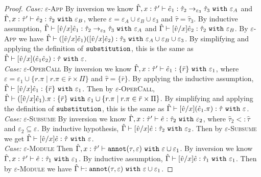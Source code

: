\begin{appendix}
\begin{proof}
\textit{Case:} \textsc{$\varepsilon$-App} By inversion we know $\hat \Gamma, x: \hat \tau' \vdash \hat e_1:\hat \tau_2 \rightarrow_{\varepsilon_3} \hat \tau_3~\mathtt{with}~ \varepsilon_A$ and $\hat \Gamma, x: \hat \tau' \vdash \hat e_2: \hat \tau_2~\mathtt{with}~ \varepsilon_B$, where $\varepsilon = \varepsilon_A \cup \varepsilon_B \cup \varepsilon_3$ and $\hat \tau = \hat \tau_3$. By inductive assumption, $\hat \Gamma \vdash [\hat v/x]\hat e_1: \hat \tau_2 \rightarrow_{\varepsilon_3} \hat \tau_3~\mathtt{with}~ \varepsilon_A$ and $\hat \Gamma \vdash [\hat v/x]\hat e_2: \hat \tau_2~\mathtt{with}~ \varepsilon_B$. By \textsc{$\varepsilon$-App} we have $\hat \Gamma \vdash ([\hat v/x]\hat e_1) ([\hat v/x]\hat e_2) : \hat \tau_3~\mathtt{with}~ \varepsilon_A \cup \varepsilon_B \cup \varepsilon_3$. By simplifying and applying the definition of $\mathtt{substitution}$, this is the same as $\hat \Gamma \vdash [\hat v/x](\hat e_1 \hat e_2): \hat \tau~\mathtt{with}~ \varepsilon$. \\

\textit{Case:} \textsc{$\varepsilon$-OperCall} By inversion we know $\hat \Gamma, x: \hat \tau' \vdash \hat e_1: \{ \bar r \}~\mathtt{with}~ \varepsilon_1$, where $\varepsilon = \varepsilon_1 \cup \{ r.\pi \mid r.\pi \in \bar r \times \Pi \}$ and $\hat \tau = \{ \bar r \}$. By applying the inductive assumption, $\hat \Gamma \vdash [\hat v/x]\hat e_1 : \{ \bar r \} ~\mathtt{with}~ \varepsilon_1$. Then by \textsc{$\varepsilon$-OperCall}, $\hat \Gamma \vdash ([\hat v/x]\hat e_1).\pi: \{ \bar r \}~\mathtt{with}~ \varepsilon_1 \cup \{ r.\pi \mid r.\pi \in \bar r \times \Pi \}$. By simplifying and applying the definition of $\mathtt{substitution}$, this is the same as $\hat \Gamma \vdash [\hat v/x](\hat e_1.\pi): \hat \tau~\mathtt{with}~ \varepsilon$.\\

\textit{Case:} \textsc{$\varepsilon$-Subsume} By inversion we know $\hat \Gamma, x: \hat \tau' \vdash \hat e: \hat \tau_2~\mathtt{with}~ \varepsilon_2$, where $\hat \tau_2 <: \hat \tau$ and $\varepsilon_2 \subseteq \varepsilon$. By inductive hypothesis, $\hat \Gamma \vdash [\hat v/x]\hat e: \hat \tau_2~\mathtt{with}~ \varepsilon_2$. Then by \textsc{$\varepsilon$-Subsume} we get $\hat \Gamma \vdash [\hat v/x]\hat e: \hat \tau~\mathtt{with}~ \varepsilon$. \\

\textit{Case:} \textsc{$\varepsilon$-Module} Then $\hat \Gamma, x: \hat \tau' \vdash  \mathtt{annot}(\tau, \varepsilon)~\mathtt{with}~ \varepsilon \cup \varepsilon_1$. By inversion we know $\hat \Gamma, x: \hat \tau' \vdash \hat e: \hat \tau_1~\mathtt{with}~ \varepsilon_1$. By inductive assumption, $\hat \Gamma \vdash [\hat v/x]\hat e: \hat \tau_1~\mathtt{with}~ \varepsilon_1$. Then by \textsc{$\varepsilon$-Module} we have $\hat \Gamma \vdash : \mathtt{annot}(\tau, \varepsilon)~\mathtt{with}~ \varepsilon \cup \varepsilon_1$.
\end{proof}


\end{appendix}
